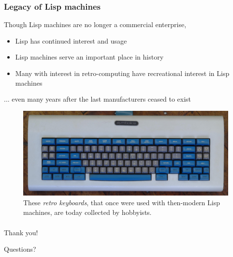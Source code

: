 \documentclass{beamer}
\begin{document}
\begin{frame}
\begin{columns}[c]
		\end{columns}
		
	\end{frame}
	\begin{frame}
		\frametitle{Legacy of Lisp machines}
	
	
	Though Lisp machines are no longer a commercial enterprise,
	
		\begin{itemize}
			\item Lisp has continued interest and usage
			\item Lisp machines serve an important place in history
			\item Many with interest in retro-computing have recreational interest in Lisp machines
		\end{itemize}
		
		... even many years after the last manufacturers ceased to exist
		
		\begin{figure}
			\includegraphics[width=0.6\linewidth]{../img/keyboard}\caption{These \textit{retro keyboards}, that once were used with then-modern Lisp machines, are today collected by hobbyists.}
		\end{figure}
	
\end{frame}


\begin{frame}
	\frametitle{\space}
	\Huge{\centerline{Thank you!}}
	\Huge{\centerline{ }}
	\Huge{\centerline{Questions?}}
\end{frame}

\end{document}
